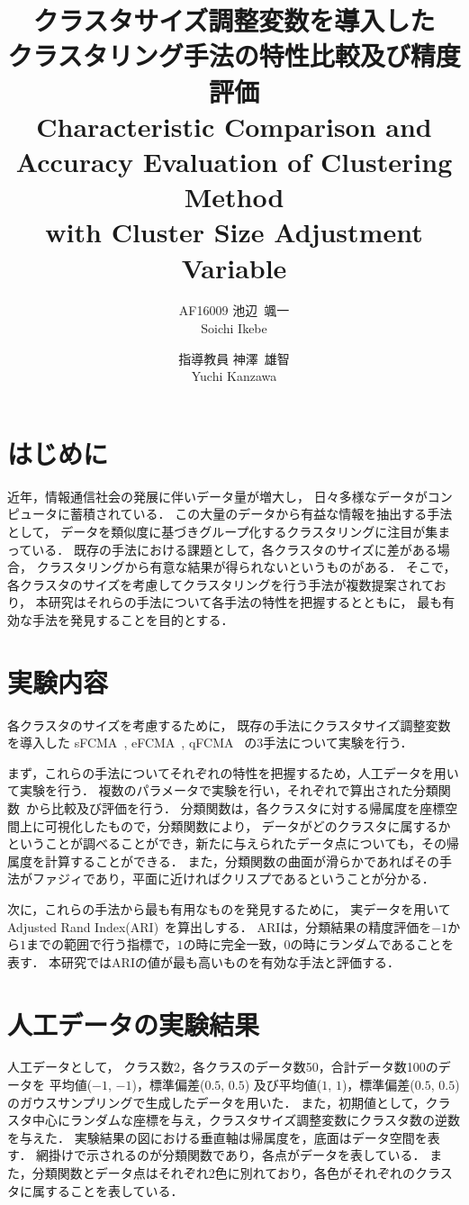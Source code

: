 \documentclass[twocolumn, a4paper]{icethesisabst}
\title{{\bf クラスタサイズ調整変数を導入した \\ クラスタリング手法の特性比較及び精度評価}
  {\normalsize \\ Characteristic Comparison and Accuracy Evaluation of Clustering Method \\ with Cluster Size Adjustment Variable}}
\author{
    AF16009 池辺~颯一 \\ Soichi Ikebe \and
    指導教員 神澤~雄智 \\ Yuchi Kanzawa
  }
\begin{document}
\maketitle


\section{はじめに}
近年，情報通信社会の発展に伴いデータ量が増大し，
日々多様なデータがコンピュータに蓄積されている．
この大量のデータから有益な情報を抽出する手法として，
データを類似度に基づきグループ化するクラスタリングに注目が集まっている．
既存の手法における課題として，各クラスタのサイズに差がある場合，
クラスタリングから有意な結果が得られないというものがある．
そこで，各クラスタのサイズを考慮してクラスタリングを行う手法が複数提案されており，
本研究はそれらの手法について各手法の特性を把握するとともに，
最も有効な手法を発見することを目的とする．


\section{実験内容}
各クラスタのサイズを考慮するために，
既存の手法にクラスタサイズ調整変数を導入した
sFCMA~\cite{sFCMA}, eFCMA~\cite{eFCMA}, qFCMA~\cite{qFCMA}
の3手法について実験を行う．

まず，これらの手法についてそれぞれの特性を把握するため，人工データを用いて実験を行う．
複数のパラメータで実験を行い，それぞれで算出された分類関数~\cite{cFunc}から比較及び評価を行う．
分類関数は，各クラスタに対する帰属度を座標空間上に可視化したもので，分類関数により，
データがどのクラスタに属するかということが調べることができ，新たに与えられたデータ点についても，その帰属度を計算することができる．
また，分類関数の曲面が滑らかであればその手法がファジィであり，平面に近ければクリスプであるということが分かる．

次に，これらの手法から最も有用なものを発見するために，
実データを用いてAdjusted Rand Index(ARI)~\cite{ARI}を算出しする．
ARIは，分類結果の精度評価を$-1$から$1$までの範囲で行う指標で，$1$の時に完全一致，$0$の時にランダムであることを表す．
本研究ではARIの値が最も高いものを有効な手法と評価する．


\section{人工データの実験結果}
人工データとして，
クラス数2，各クラスのデータ数50，合計データ数100のデータを
平均値($-1$, $-1$)，標準偏差($0.5$, $0.5$)
及び平均値($1$, $1$)，標準偏差($0.5$, $0.5$)
のガウスサンプリングで生成したデータを用いた．
また，初期値として，クラスタ中心にランダムな座標を与え，クラスタサイズ調整変数にクラスタ数の逆数を与えた．
実験結果の図における垂直軸は帰属度を，底面はデータ空間を表す．
網掛けで示されるのが分類関数であり，各点がデータを表している．
また，分類関数とデータ点はそれぞれ$2$色に別れており，各色がそれぞれのクラスタに属することを表している．
\end{document}

